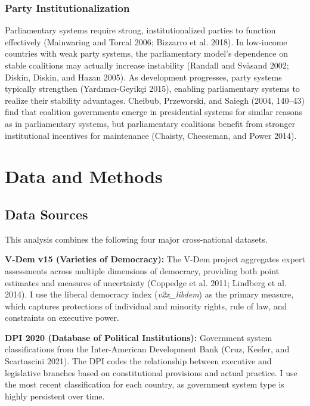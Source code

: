 \documentclass[
  letterpaper,
  DIV=11,
  numbers=noendperiod]{scrartcl}
\begin{document}
\subsubsection{Party
Institutionalization}\label{party-institutionalization}

Parliamentary systems require strong, institutionalized parties to
function effectively (Mainwaring and Torcal 2006; Bizzarro et al. 2018).
In low-income countries with weak party systems, the parliamentary
model's dependence on stable coalitions may actually increase
instability (Randall and Svåsand 2002; Diskin, Diskin, and Hazan 2005).
As development progresses, party systems typically strengthen
(Yardımcı-Geyikçi 2015), enabling parliamentary systems to realize their
stability advantages. Cheibub, Przeworski, and Saiegh (2004, 140--43)
find that coalition governments emerge in presidential systems for
similar reasons as in parliamentary systems, but parliamentary
coalitions benefit from stronger institutional incentives for
maintenance (Chaisty, Cheeseman, and Power 2014).

\section{Data and Methods}\label{sec-data}

\subsection{Data Sources}\label{data-sources}

This analysis combines the following four major cross-national datasets.

\textbf{V-Dem v15 (Varieties of Democracy):} The V-Dem project
aggregates expert assessments across multiple dimensions of democracy,
providing both point estimates and measures of uncertainty (Coppedge et
al. 2011; Lindberg et al. 2014). I use the liberal democracy index
(\emph{v2x\_libdem}) as the primary measure, which captures protections
of individual and minority rights, rule of law, and constraints on
executive power.

\textbf{DPI 2020 (Database of Political Institutions):} Government
system classifications from the Inter-American Development Bank (Cruz,
Keefer, and Scartascini 2021). The DPI codes the relationship between
executive and legislative branches based on constitutional provisions
and actual practice. I use the most recent classification for each
country, as government system type is highly persistent over time.
\end{document}
